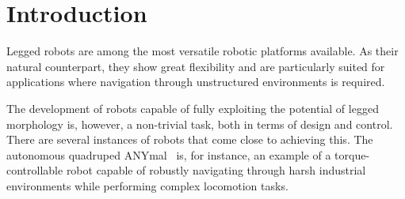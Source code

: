 \section{Introduction}\label{sec:introduction}

 Legged robots are among the most versatile robotic platforms available. As their natural counterpart, they show great flexibility and are particularly suited for applications where navigation through unstructured environments is required. 

The development of robots capable of fully exploiting the potential of legged morphology is, however, a non-trivial task, both in terms of design and control. There are several instances of robots that come close to achieving this.
The autonomous quadruped ANYmal~\cite{agile_bots::hutter2016anymal} is, for instance, an example of a torque-controllable robot capable of robustly navigating through harsh industrial environments while performing complex locomotion tasks.

